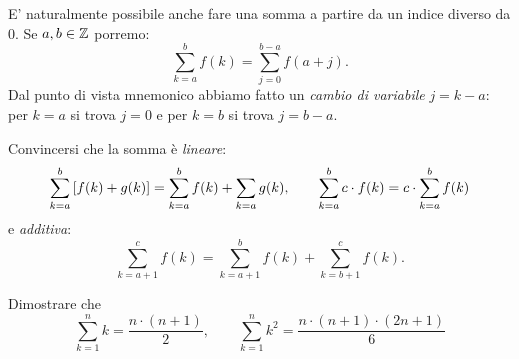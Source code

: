 E' naturalmente possibile anche fare una somma a partire da un indice 
diverso da $0$. Se $a,b\in {\mathbb Z}$ porremo:
\[
  \sum_{k=a}^b f(k) = \sum_{j=0}^{b-a} f(a+j).
\]
Dal punto di vista mnemonico abbiamo fatto 
un \emph{cambio di variabile} $j=k-a$:
per $k=a$ si trova $j=0$ e per $k=b$ si trova $j=b-a$.

\begin{exercise}
  Convincersi che la somma è \emph{lineare}:
  \[
  \sum_{k=a}^b  {\left[ f(k) + g(k) \right]} 
  = \sum_{k=a}^b f(k) + \sum_{k=a} g(k), 
  \qquad
  \sum_{k=a}^b c\cdot f(k) 
  =c\cdot \sum_{k=a}^b f(k)
  \]
  e \emph{additiva}:
  \[
    \sum_{k=a+1}^c f(k) = \sum_{k=a+1}^b f(k) + \sum_{k=b+1}^c f(k).  
  \]
\end{exercise}

\begin{exercise}
  Dimostrare che 
  \[
    \sum_{k=1}^n k = \frac{n\cdot (n+1)}{2}, \qquad
    \sum_{k=1}^n k^2 = \frac{n\cdot (n+1)\cdot (2n+1)}{6}
  \]
\end{exercise}
